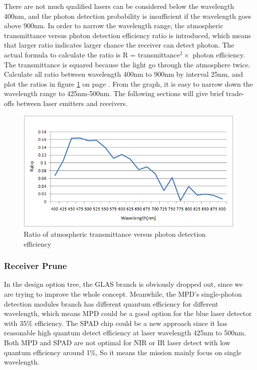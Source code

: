 There are not much qualified \acs{laser}s can be considered below the wavelength 400nm, and the photon detection probability is insufficient if the wavelength goes above 900nm. In order to narrow the wavelength range, the atmospheric transmittance versus photon detection efficiency ratio is introduced, which means that larger ratio indicates larger chance the receiver can detect photon. The actual formula to calculate the ratio is R = transmittance$^{2} \times$ photon efficiency. The transmittance is squared because the light go through the atmosphere twice. Calculate all ratio between wavelength 400nm to 900nm by interval 25nm, and plot the ratios in figure \ref{fig:wavelength_estimation} on page \pageref{fig:wavelength_estimation}. From the graph, it is easy to narrow down the wavelength range to 425nm-500nm.  The following sections will give brief trade-offs between \acs{laser} emitters and receivers.

\begin{figure}[ht!]
\centering
\includegraphics[scale=1]{chapters/img/wavelength_estimation.png}
\caption{Ratio of atmospheric transmittance versus photon detection efficiency}
\label{fig:wavelength_estimation}
\end{figure}

\subsubsection{Receiver Prune}
\label{TOReceiverP}
In the design option tree, the GLAS branch is obviously dropped out, since we are trying to improve the whole concept. Meanwhile, the \ac{MPD}'s single-photon detection modules branch has different quantum efficiency for different wavelength, which means MPD could be a good option for the blue laser detector with 35\% efficiency. The \ac{SPAD} chip could be a new approach since it has reasonable high quantum detect efficiency at laser wavelength 425nm to 500nm. Both \acs{MPD} and \acs{SPAD} are not optimal for \acs{NIR} or \acs{IR} laser detect with low quantum efficiency around 1\%, So it means the mission mainly focus on single wavelength.

